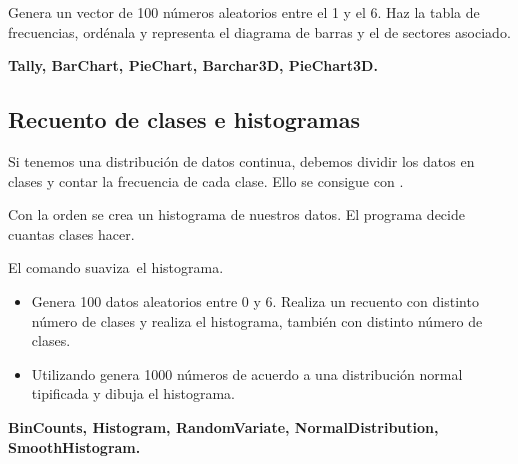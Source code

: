 \documentclass[a4paper,10pt, draft]{article}
\newcommand{\com}[1]{\textbf{\color{blue}{#1}}}
\newenvironment{ejer}{\begin{tcolorbox}[center title, title=Ejercicios,
fonttitle=\sffamily\bfseries,colback=blue!5,colframe=orange]}{\end{tcolorbox}}
\newenvironment{funciones}{\begin{tcolorbox}[center title, title=Nuevas funciones, fonttitle=\sffamily\bfseries, colback=green!5!white,colframe=red!75!black]}{\end{tcolorbox}\bigskip}
\begin{document}
\begin{ejer}

Genera un vector de 100 números aleatorios entre el 1 y el 6. Haz la tabla de frecuencias, ordénala y representa el diagrama de barras y el de sectores asociado.

\end{ejer}

\begin{funciones}

\textbf{Tally, BarChart, PieChart, Barchar3D, PieChart3D.}


\end{funciones}

\newpage

\subsection{Recuento de clases e histogramas}

Si tenemos una distribución de datos continua,  debemos dividir los datos en clases y contar la frecuencia de cada clase. Ello se consigue con \com{BinCounts[list,\{a,b,inc\}]}.

Con la orden \com{Histogram[list]} se crea un histograma de nuestros datos. El programa decide cuantas clases hacer. 

El comando \com{SmoothHistogram[list]}  \guillemotleft suaviza\guillemotright\  el histograma.


\begin{ejer}

\begin{itemize}

\item Genera 100 datos aleatorios entre 0 y 6. Realiza un recuento con distinto número de clases y realiza el histograma, también con distinto número de clases.


\item Utilizando \com{RandomVariate} genera 1000 números de acuerdo a una distribución normal tipificada y dibuja el histograma.


\end{itemize}

\end{ejer}

\begin{funciones}

\textbf{BinCounts, Histogram, RandomVariate, NormalDistribution, SmoothHistogram.}

\end{funciones}
\end{document}
